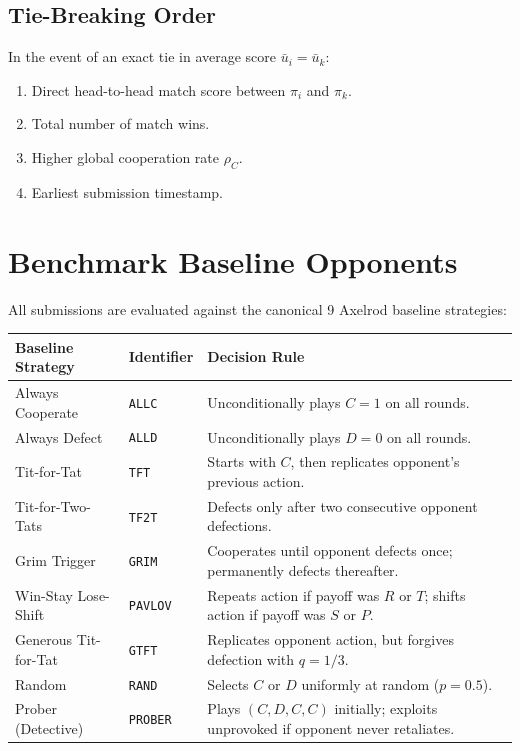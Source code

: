 \documentclass[11pt,a4paper]{article}
\begin{document}
\subsection{Tie-Breaking Order}
In the event of an exact tie in average score $\bar{u}_i = \bar{u}_k$:
\begin{enumerate}
    \item Direct head-to-head match score between $\pi_i$ and $\pi_k$.
    \item Total number of match wins.
    \item Higher global cooperation rate $\rho_C$.
    \item Earliest submission timestamp.
\end{enumerate}


\section{Benchmark Baseline Opponents}

All submissions are evaluated against the canonical 9 Axelrod baseline strategies:

\begin{center}
\begin{tabularx}{\textwidth}{llX}
\toprule
\textbf{Baseline Strategy} & \textbf{Identifier} & \textbf{Decision Rule} \\
\midrule
Always Cooperate & \texttt{ALLC} & Unconditionally plays $C = 1$ on all rounds. \\
Always Defect & \texttt{ALLD} & Unconditionally plays $D = 0$ on all rounds. \\
Tit-for-Tat & \texttt{TFT} & Starts with $C$, then replicates opponent's previous action. \\
Tit-for-Two-Tats & \texttt{TF2T} & Defects only after two consecutive opponent defections. \\
Grim Trigger & \texttt{GRIM} & Cooperates until opponent defects once; permanently defects thereafter. \\
Win-Stay Lose-Shift & \texttt{PAVLOV} & Repeats action if payoff was $R$ or $T$; shifts action if payoff was $S$ or $P$. \\
Generous Tit-for-Tat & \texttt{GTFT} & Replicates opponent action, but forgives defection with $q = 1/3$. \\
Random & \texttt{RAND} & Selects $C$ or $D$ uniformly at random ($p = 0.5$). \\
Prober (Detective) & \texttt{PROBER} & Plays $(C, D, C, C)$ initially; exploits unprovoked if opponent never retaliates. \\
\bottomrule
\end{tabularx}
\end{center}
\end{document}
